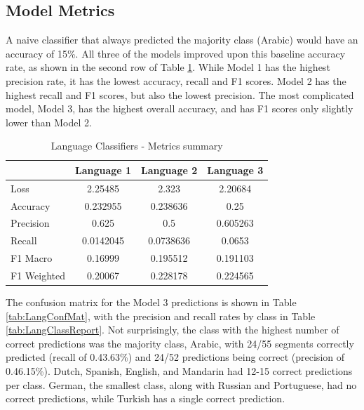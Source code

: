 \documentclass[11pt, letterpaper]{article}
\begin{document}

\subsection{Model Metrics}
A naive classifier that always predicted the majority class (Arabic) would have an accuracy of 15\%.  All three of the models improved upon this baseline accuracy rate, as shown in the second row of Table \ref{tab:LangMetricsSum}. While Model 1 has the highest precision rate, it has the lowest accuracy, recall and F1 scores. Model 2 has the highest recall and F1 scores, but also the lowest precision. The most complicated model, Model 3, has the highest overall accuracy, and has F1 scores only slightly lower than Model 2.

\begin{table}[h]
\begin{center}
\caption{Language Classifiers - Metrics summary}
\begin{tabular}{l c c c}
		&Language 1	&Language 2	&Language 3 \\ \hline
Loss		&2.25485		&2.323		&2.20684 \\
Accuracy	&0.232955	&0.238636	&0.25\\
Precision	&0.625		&0.5			&0.605263\\
Recall	&0.0142045	&0.0738636	&0.0653 \\ 

F1 Macro	&0.16999		&0.195512	&0.191103\\
F1 Weighted	&0.20067	&0.228178	&0.224565\\
\end{tabular}
\label{tab:LangMetricsSum} 
\end{center}
\end{table} 

The confusion matrix for the Model 3 predictions is shown in Table \ref{tab:LangConfMat}, with the precision and recall rates by class in Table \ref{tab:LangClassReport}. Not surprisingly, the class with the highest number of correct predictions was the majority class, Arabic, with 24/55 segments correctly predicted (recall of 0.43.63\%) and 24/52 predictions being correct (precision of 0.46.15\%). Dutch, Spanish, English, and Mandarin had 12-15 correct predictions per class. German, the smallest class, along with Russian and Portuguese, had no correct predictions, while Turkish has a single correct prediction.
\end{document}
